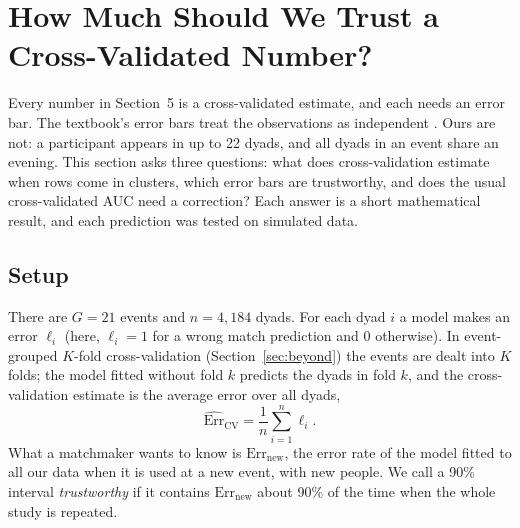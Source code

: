 
\section{How Much Should We Trust a Cross-Validated Number?}
\label{sec:errorbars}

Every number in Section~5 is a cross-validated estimate, and each needs an error bar. The textbook's error bars treat
the observations as independent \cite[Section 5.1.3, pp.~206--208]{James:2023}. Ours are not: a participant appears in up
to 22 dyads, and all dyads in an event share an evening. This section asks three questions: what does
cross-validation estimate when rows come in clusters, which error bars are trustworthy, and does the usual
cross-validated AUC need a correction? Each answer is a short mathematical result, and each prediction was tested on
simulated data.

\subsection{Setup}

There are $G=21$ events and $n=4{,}184$ dyads. For each dyad $i$ a model makes an error $\ell_i$ (here, $\ell_i=1$ for a wrong
match prediction and 0 otherwise). In event-grouped $K$-fold cross-validation (Section~\ref{sec:beyond}) the events are
dealt into $K$ folds; the model fitted without fold $k$ predicts the dyads in fold $k$, and the cross-validation estimate
is the average error over all dyads,
\[
\widehat{\mathrm{Err}}_{\mathrm{CV}}=\frac1n\sum_{i=1}^n\ell_i .
\]
What a matchmaker wants to know is $\mathrm{Err}_{\mathrm{new}}$, the error rate of the model fitted to all our data when it is
used at a new event, with new people. We call a 90\% interval \emph{trustworthy} if it contains $\mathrm{Err}_{\mathrm{new}}$ about
90\% of the time when the whole study is repeated.

